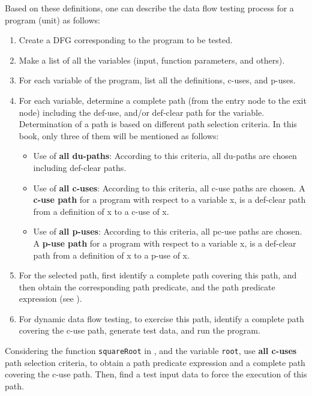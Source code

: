 Based on these definitions, one can describe the data flow testing process for a program (unit) as follows:
\begin{enumerate}
    \item Create a DFG corresponding to the program to be tested.
    \item Make a list of all the variables (input, function parameters, and others).
    \item For each variable of the program, list all the definitions, c-uses, and p-uses. 
    \item For each variable, determine a complete path (from the entry node to the exit node) including the def-use, and/or def-clear path for the variable. Determination of a path is based on different path selection criteria. In this book, only three of them will be mentioned as follows:
\begin{itemize}
    \item Use of \textbf{all du-paths}: According to this criteria, all du-paths are chosen including def-clear paths. 
    \item Use of \textbf{all c-uses}: According to this criteria, all c-use paths are chosen. A \textbf{c-use path} for a program with respect to a variable x, is a def-clear path from a definition of x to a c-use of x.  
    \item Use of \textbf{all p-uses}: According to this criteria, all pc-use paths are chosen. A \textbf{p-use path} for a program with respect to a variable x, is a def-clear path from a definition of x to a p-use of x. 
\end{itemize}
    \item For the selected path, first identify a complete path covering this path, and then obtain the corresponding path predicate, and the path predicate expression (see ).
    \item For dynamic data flow testing, to exercise this path, identify a complete path covering the c-use path, generate test data, and run the program.
\end{enumerate}

\begin{example}
Considering the function \lstinline!squareRoot! in , and the variable \lstinline!root!, use \textbf{all c-uses} path selection criteria, to obtain a path predicate expression and a complete path covering the c-use path. Then, find a test input data to force the execution of this path.
\end{example}


